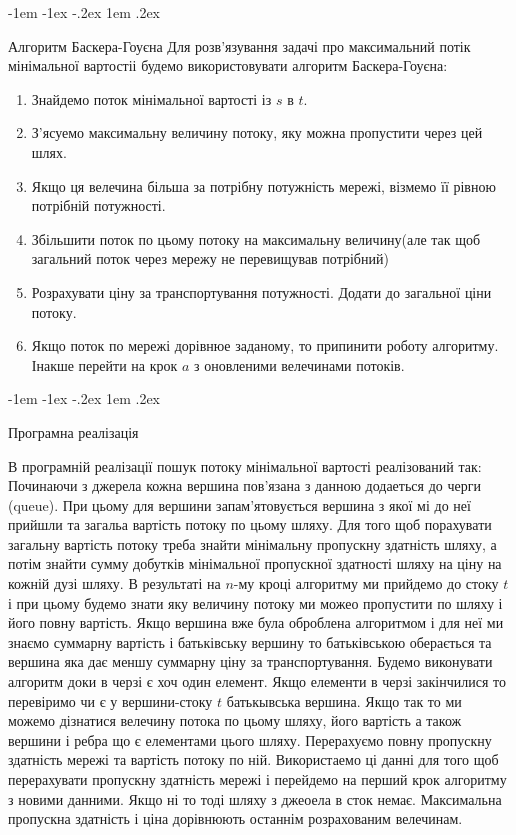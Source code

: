 \documentclass[a4paper,14pt,russian,ukrainian,oneside,final]{extreport}
\makeatletter
\newlength{\fivecharsapprox}
\renewcommand\subsection{%
  \@startsection{subsection}{2}%
    {\fivecharsapprox}%
    {-1em \@plus -1ex \@minus -.2ex}%
    {1em \@plus .2ex}%
    {\raggedright\hyphenpenalty=10000\normalfont\normalsize\bfseries}}
\makeatother
\begin{document}
 

\subsection{Алгоритм Баскера-Гоуєна}
Для розв'язування задачі про максимальний потік мінімальної вартостіі будемо використовувати алгоритм Баскера-Гоуєна:
\begin{enumerate}
\item Знайдемо поток мінімальної вартості із $ s $ в $ t $.
\item З'ясуемо максимальну величину потоку, яку можна пропустити через цей шлях.
\item Якщо ця велечина більша за потрібну потужність мережі, візмемо її рівною потрібній потужності.
\item 	Збільшити поток по цьому потоку на максимальну величину(але так щоб загальний  поток через мережу не перевищував потрібний)
\item 	Розрахувати ціну за транспортування потужності. Додати до загальної ціни потоку.
\item 	Якщо поток по мережі дорівнюе заданому, то припинити роботу алгоритму. Інакше перейти на крок $a$ з оновленими велечинами потоків.
\end{enumerate}

\subsection{Програмна реалізація}

В програмній реалізації пошук потоку мінімальної вартості реалізований так:
Починаючи з джерела кожна вершина пов'язана з данною додаеться до черги (queue). При цьому для вершини запам'ятовується  вершина з якої мі до неї прийшли та загальа вартість потоку по цьому шляху. Для того щоб порахувати загальну вартість потоку треба  знайти мінімальну пропускну здатність шляху, а потім знайти сумму добутків мінімальної пропускної здатності шляху на ціну на кожній дузі шляху.
В результаті на $n$-му кроці алгоритму ми прийдемо до стоку $t$ і при цьому будемо знати яку величину потоку ми можео пропустити по шляху і його повну вартість.
Якщо вершина вже була оброблена алгоритмом і для неї ми знаємо суммарну вартість і батьківську вершину то батьківською оберається та вершина яка дає меншу суммарну  ціну за транспортування.
Будемо виконувати алгоритм доки в черзі є хоч один елемент.
Якщо елементи в черзі закінчилися то перевіримо чи є у вершини-стоку $t$ батькывська вершина.
Якщо так то ми можемо дізнатися велечину потока по цьому шляху, його вартість а також вершини і ребра що є елементами цього шляху.
Перерахуємо повну пропускну здатність мережі та вартість потоку по ній.
Використаемо ці данні для того щоб перерахувати пропускну здатність мережі і перейдемо на перший крок алгоритму з новими данними.
Якщо ні то тоді шляху з джеоела в сток немає.
Максимальна пропускна здатність і ціна дорівнюють останнім розрахованим велечинам.
\end{document}
